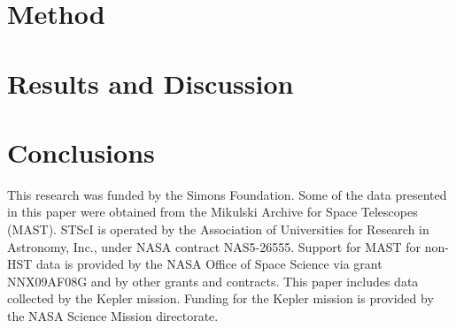 \documentclass[useAMS, usenatbib, preprint, 12pt]{aastex}
\begin{document}
\section{Method}

\section{Results and Discussion}

\section{Conclusions}

This research was funded by the Simons Foundation.
Some of the data presented in this paper were obtained from the Mikulski
Archive for Space Telescopes (MAST).
STScI is operated by the Association of Universities for Research in
Astronomy, Inc., under NASA contract NAS5-26555.
Support for MAST for non-HST data is provided by the NASA Office of Space
Science via grant NNX09AF08G and by other grants and contracts.
This paper includes data collected by the Kepler mission. Funding for the
Kepler mission is provided by the NASA Science Mission directorate.



\end{document}
